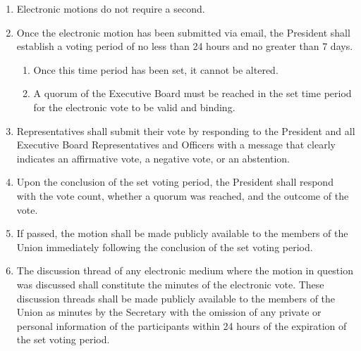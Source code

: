 \documentclass{uniondoc}
\begin{document}
\begin{enumerate}
\begin{enumerate}
\begin{enumerate}
    \end{enumerate}
  \item Electronic motions do not require a second.
  \item Once the electronic motion has been submitted via email, the President shall establish a voting period of no less than 24 hours and no greater than 7 days.
    \begin{enumerate}
    \item Once this time period has been set, it cannot be altered.
    \item A quorum of the Executive Board must be reached in the set time period for the electronic vote to be valid and binding.
    \end{enumerate}
  \item Representatives shall submit their vote by responding to the President and all Executive Board Representatives and Officers with a message that clearly indicates an affirmative vote, a negative vote, or an abstention.
  \item Upon the conclusion of the set voting period, the President shall respond with the vote count, whether a quorum was reached, and the outcome of the vote.
  \item If passed, the motion shall be made publicly available to the members of the Union immediately following the conclusion of the set voting period.
  \item The discussion thread of any electronic medium where the motion in question was discussed shall constitute the minutes of the electronic vote. These discussion threads shall be made publicly available to the members of the Union as minutes by the Secretary with the omission of any private or personal information of the participants within 24 hours of the expiration of the set voting period.
  \end{enumerate}
\end{enumerate}

\end{document}

